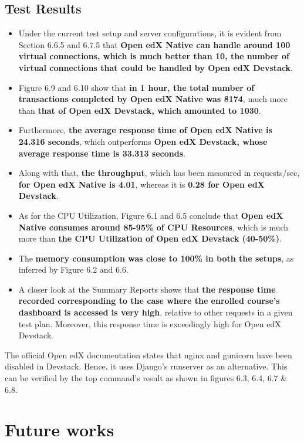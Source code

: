 \documentclass[12pt]{report}
\begin{document}
\section{Test Results} 
\begin{itemize}
	\item Under the current test setup and server configurations, it is evident from Section 6.6.5 and 6.7.5 that \textbf{Open edX Native can handle around 100 virtual connections, which is much better than 10, the number of virtual connections that could be handled by Open edX Devstack}.
	\item Figure 6.9 and 6.10 show that \textbf{in 1 hour, the total number of transactions completed by Open edX Native was 8174}, much more than \textbf{that of Open edX Devstack, which amounted to 1030}.
	\item Furthermore, \textbf{the average response time of Open edX Native is 24.316 seconds}, which outperforms \textbf{Open edX Devstack, whose average response time is 33.313 seconds}.
	\item Along with that, \textbf{the throughput}, which has been measured in requests/sec, \textbf{for Open edX Native is 4.01}, whereas it is \textbf{0.28 for Open edX Devstack}.
	\item As for the CPU Utilization, Figure 6.1 and 6.5 conclude that \textbf{Open edX Native consumes around 85-95\% of CPU Resources}, which is much more than \textbf{the CPU Utilization of Open edX Devstack (40-50\%)}.
	\item The \textbf{memory consumption was close to 100\% in both the setups}, as inferred by Figure 6.2 and 6.6.
	\item A closer look at the Summary Reports shows that \textbf{the response time recorded corresponding to the case where the enrolled course's dashboard is accessed is very high}, relative to other requests in a given test plan. Moreover, this response time is exceedingly high for Open edX Devstack.
\end{itemize}

\par
The official Open edX documentation states that nginx and gunicorn have been disabled in Devstack. Hence, it uses Django's runserver as an alternative. This can be verified by the top command's result as shown in figures 6.3, 6.4, 6.7 \& 6.8.

\chapter{Future works}
\end{document}
